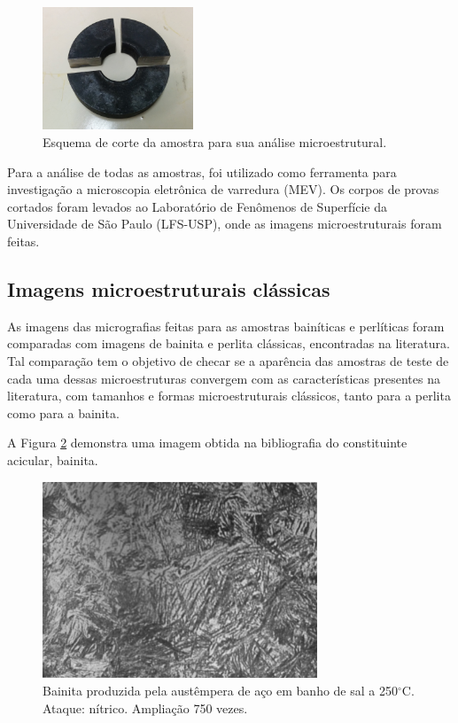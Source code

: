 \documentclass[
12pt,
openany, %
oneside, %
a4paper,			
english,			
brazil			        %
]{abntbibufjf}
\begin{document}
	\begin{figure}[H]
		\centering
		\includegraphics[width=0.4\textwidth]{corte_micrografia}
		\caption{Esquema de corte da amostra para sua análise microestrutural.}
		\label{fig:corte_micrografia}
	\end{figure}
	
	Para a análise de todas as amostras, foi utilizado como ferramenta para investigação a microscopia eletrônica de varredura (MEV). Os corpos de provas cortados foram levados ao Laboratório de Fenômenos de Superfície da Universidade de São Paulo (LFS-USP), onde as imagens microestruturais foram feitas.


	\subsection{Imagens microestruturais clássicas}
	\label{sec:imagens_bibliografia}
	
	As imagens das micrografias feitas para as amostras bainíticas e perlíticas foram comparadas com imagens de bainita e perlita clássicas, encontradas na literatura. Tal comparação tem o objetivo de checar se a aparência das amostras de teste de cada uma dessas microestruturas convergem com as características presentes na literatura, com tamanhos e formas microestruturais clássicos, tanto para a perlita como para a bainita.
	
	A Figura \ref{fig:bainita_bib2} demonstra uma imagem obtida na bibliografia do constituinte acicular, bainita.
	
	\begin{figure}[H]
		\centering
		\includegraphics[width=0.73\textwidth]{bainita_bib2}
		\caption{Bainita produzida pela austêmpera de aço em banho de sal a 250$^\circ$C. Ataque: nítrico. Ampliação 750 vezes. \cite{colpaert1994metalografia}}
		\label{fig:bainita_bib2}
	\end{figure}
\end{document}
